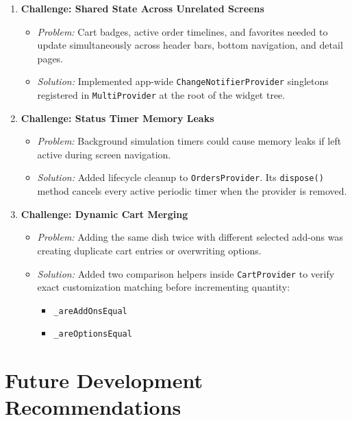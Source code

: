 \documentclass[11pt,a4paper]{article}
\begin{document}
\begin{enumerate}[leftmargin=*]
    \item \textbf{Challenge: Shared State Across Unrelated Screens}
    \begin{itemize}
        \item \textit{Problem:} Cart badges, active order timelines, and favorites needed to update simultaneously across header bars, bottom navigation, and detail pages.
        \item \textit{Solution:} Implemented app-wide \texttt{ChangeNotifierProvider} singletons registered in \texttt{MultiProvider} at the root of the widget tree.
    \end{itemize}
    \item \textbf{Challenge: Status Timer Memory Leaks}
    \begin{itemize}
        \item \textit{Problem:} Background simulation timers could cause memory leaks if left active during screen navigation.
        \item \textit{Solution:} Added lifecycle cleanup to \texttt{OrdersProvider}. Its \texttt{dispose()} method cancels every active periodic timer when the provider is removed.
    \end{itemize}
    \item \textbf{Challenge: Dynamic Cart Merging}
    \begin{itemize}
        \item \textit{Problem:} Adding the same dish twice with different selected add-ons was creating duplicate cart entries or overwriting options.
        \item \textit{Solution:} Added two comparison helpers inside \texttt{CartProvider} to verify exact customization matching before incrementing quantity:
        \begin{itemize}
            \item \texttt{\_areAddOnsEqual}
            \item \texttt{\_areOptionsEqual}
        \end{itemize}
    \end{itemize}
\end{enumerate}

\FloatBarrier

\section{Future Development Recommendations}
\end{document}
